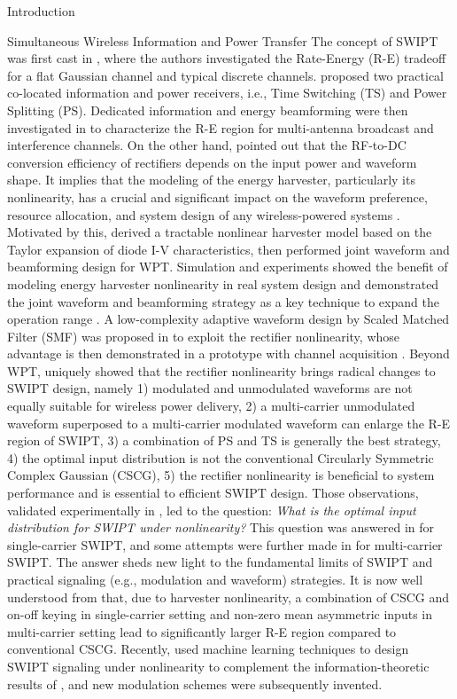 \documentclass[journal]{IEEEtran}
\begin{document}
\begin{section}{Introduction}
\begin{subsection}{Simultaneous Wireless Information and Power Transfer}
            The concept of SWIPT was first cast in \cite{Varshney2008}, where the authors investigated the Rate-Energy (R-E) tradeoff for a flat Gaussian channel and typical discrete channels. \cite{Zhou2013} proposed two practical co-located information and power receivers, i.e., Time Switching (TS) and Power Splitting (PS). Dedicated information and energy beamforming were then investigated in \cite{Zhang2013,Park2014} to characterize the R-E region for multi-antenna broadcast and interference channels. On the other hand, \cite{Trotter2009} pointed out that the RF-to-DC conversion efficiency of rectifiers depends on the input power and waveform shape. It implies that the modeling of the energy harvester, particularly its nonlinearity, has a crucial and significant impact on the waveform preference, resource allocation, and system design of any wireless-powered systems \cite{Trotter2009,Clerckx2018,Clerckx2019}. Motivated by this, \cite{Clerckx2016a} derived a tractable nonlinear harvester model based on the Taylor expansion of diode I-V characteristics, then performed joint waveform and beamforming design for WPT. Simulation and experiments showed the benefit of modeling energy harvester nonlinearity in real system design \cite{Kim2019,Kim2020a} and demonstrated the joint waveform and beamforming strategy as a key technique to expand the operation range \cite{Kim2021}. A low-complexity adaptive waveform design by Scaled Matched Filter (SMF) was proposed in \cite{Clerckx2017} to exploit the rectifier nonlinearity, whose advantage is then demonstrated in a prototype with channel acquisition \cite{Kim2017}. Beyond WPT, \cite{Clerckx2018b} uniquely showed that the rectifier nonlinearity brings radical changes to SWIPT design, namely 1) modulated and unmodulated waveforms are not equally suitable for wireless power delivery, 2) a multi-carrier unmodulated waveform superposed to a multi-carrier modulated waveform can enlarge the R-E region of SWIPT, 3) a combination of PS and TS is generally the best strategy, 4) the optimal input distribution is not the conventional Circularly Symmetric Complex Gaussian (CSCG), 5) the rectifier nonlinearity is beneficial to system performance and is essential to efficient SWIPT design. Those observations, validated experimentally in \cite{Kim2019}, led to the question: \emph{What is the optimal input distribution for SWIPT under nonlinearity?} This question was answered in \cite{Varasteh2020} for single-carrier SWIPT, and some attempts were further made in \cite{Varasteh2019d} for multi-carrier SWIPT. The answer sheds new light to the fundamental limits of SWIPT and practical signaling (e.g., modulation and waveform) strategies. It is now well understood from \cite{Clerckx2018b,Varasteh2020,Varasteh2019d} that, due to harvester nonlinearity, a combination of CSCG and on-off keying in single-carrier setting and non-zero mean asymmetric inputs in multi-carrier setting lead to significantly larger R-E region compared to conventional CSCG. Recently, \cite{Varasteh2020a} used machine learning techniques to design SWIPT signaling under nonlinearity to complement the information-theoretic results of \cite{Varasteh2020}, and new modulation schemes were subsequently invented.

\end{subsection}
\end{section}
\end{document}
